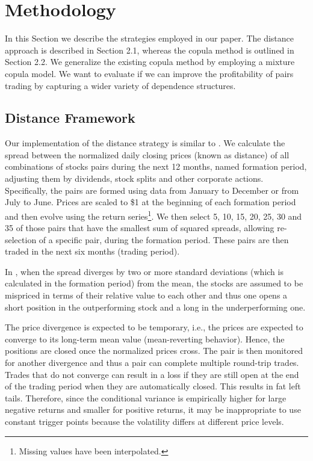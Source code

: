 	\section{Methodology}
	
	In this Section we describe the strategies employed in our paper. The distance approach is described in Section 2.1, whereas the copula method is outlined in Section 2.2. We generalize the existing copula method by employing a mixture copula model. We want to evaluate if we can improve the profitability of pairs trading by capturing a wider variety of dependence structures. 
	
	\subsection{Distance Framework}
	
	Our implementation of the distance strategy is similar to \citet*{bv12}. We calculate the spread between the normalized daily closing prices (known as distance) of all combinations of stocks pairs during the next 12 months, named formation period, adjusting them by dividends, stock splits and other corporate actions. Specifically, the pairs are formed using data from January to December or from July to June. Prices are scaled to \$1 at the beginning of each formation period and then evolve using the return series\footnote{%
		Missing values have been interpolated.}.  We then select 5, 10, 15, 20, 25, 30 and 35 of those pairs that have the smallest sum of squared spreads, allowing re-selection of a specific pair, during the formation period. These pairs are then traded in the next six months (trading period).
	
In \citet*{ggr06}, when the spread diverges by two or more standard deviations (which is calculated in the formation period) from the mean, the stocks are assumed to be mispriced in terms of their relative value to each other and thus one opens a short position in the outperforming stock and a long in the underperforming one. 

The price divergence is expected to be temporary, i.e., the prices are expected to converge to its long-term mean value (mean-reverting behavior). Hence, the positions are closed once the normalized prices cross. The pair is then monitored for another divergence and thus a pair can complete multiple round-trip trades. Trades that do not converge can result in a loss if they are still open at the end of the trading period when they are automatically closed. This results in fat left tails. Therefore, since the conditional variance is empirically higher for large negative returns and smaller for positive returns, it may be inappropriate to use constant trigger points because the volatility differs at different price levels.

